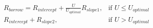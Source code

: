 \documentclass[preview]{standalone}
\begin{document}
\begin{align*}
R_{borrow} = R_{intercept} + \frac{U}{U_{optimal}}R_{slope1}, & \text{if } U \leq U_{optimal} \\ R_{intercept} + R_{slope2}, & \text{if } U > U_{optimal}
\end{align*}
\end{document}
